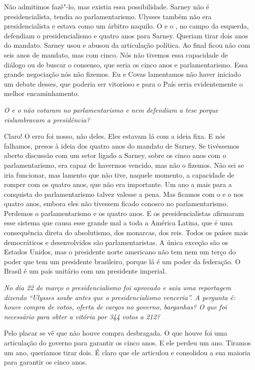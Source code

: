 Não admitimos fazê"-lo, mas existia essa possibilidade.
Sarney não é presidencialista, tendia ao parlamentarismo. Ulysses também
não era presidencialista e estava como um árbitro naquilo. O  e o ,
no campo da esquerda, defendiam o presidencialismo e quatro anos para
Sarney. Queriam tirar dois anos do mandato. Sarney usou e abusou da
articulação política. Ao final ficou não com seis anos de mandato, mas
com cinco. Nós não tivemos essa capacidade de diálogo ou de buscar o
consenso, que seria os cinco anos e parlamentarismo. Essa grande
negociação nós não fizemos. Eu e Covas lamentamos não haver iniciado um
debate desses, que poderia ser vitorioso e para o País seria
evidentemente o melhor encaminhamento.

\medskip

\emph{O  e o  não votaram no parlamentarismo e nem defendiam a
tese porque vislumbravam a presidência?}

Claro! O erro foi nosso, não deles. Eles estavam lá com
a ideia fixa. E nós falhamos, presos à ideia dos quatro anos do mandato
de Sarney. Se tivéssemos aberto discussão com um setor ligado a Sarney,
sobre os cinco anos com o parlamentarismo, era capaz de havermos
vencido, mas não o fizemos. Não sei se iria funcionar, mas lamento que
não tive, naquele momento, a capacidade de romper com os quatro anos,
que não era importante. Um ano a mais para a conquista do
parlamentarismo talvez valesse a pena. Mas ficamos com o  e o  nos
quatro anos, embora eles não tivessem ficado conosco no parlamentarismo.
Perdemos o parlamentarismo e os quatro anos. E os presidencialistas
afirmaram esse sistema que causa esse grande mal a toda a América
Latina, que é uma consequência direta do absolutismo, dos monarcas, dos
reis. Todos os países mais democráticos e desenvolvidos são
parlamentaristas. A única exceção são os Estados Unidos, mas o
presidente norte americano não tem nem um terço do poder que tem um
presidente brasileiro, porque lá é um poder da federação. O Brasil é um
país unitário com um presidente imperial.

\medskip

\emph{No dia 22 de março o presidencialismo foi aprovado e saiu uma
reportagem dizendo ``Ulysses soube antes que o presidencialismo
venceria''. A pergunta é: houve compra de votos, oferta de cargos no
governo, barganhas? O que foi necessário para obter a vitória por 344
votos a 212?}

Pelo placar se vê que não houve compra desbragada. O
que houve foi uma articulação do governo para garantir os cinco anos. E
ele perdeu um ano. Tiramos um ano, queríamos tirar dois. É claro que ele
articulou e consolidou a sua maioria para garantir os cinco anos.

